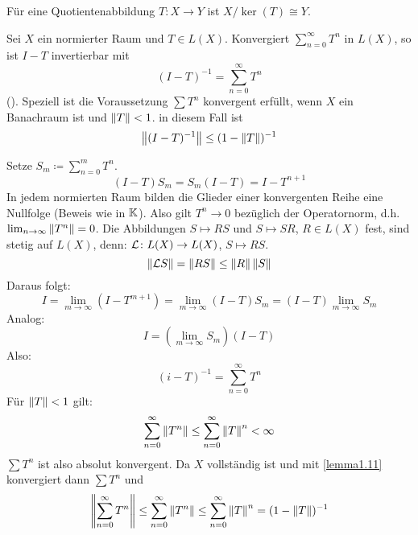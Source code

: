 \begin{bemerkung*}
	F\"ur eine Quotientenabbildung $ T\colon X\rightarrow Y $ ist $ X/\ker(T)\cong Y $. 
\end{bemerkung*}
\begin{satz}
	Sei $ X $ ein normierter Raum und $ T\in L(X) $. Konvergiert $ \sum_{n=0}^{\infty}T^n $ in $ L(X) $, so ist $ I-T $ invertierbar mit
	\[ (I-T)^{-1}=\sum_{n=0}^{\infty}T^n \] (). Speziell ist die Voraussetzung $ \sum T^n $ konvergent erf\"ullt, wenn $ X $ ein Banachraum ist und $ \left\|T\right\|<1 $. in diesem Fall ist
	\[ \left\|(I-T)^{-1}\right\|\leq (1-\left\|T\right\|)^{-1} \]
\end{satz}
\begin{beweis}
	Setze $ S_m\coloneqq\sum_{n=0}^m T^n $.
	\[ (I-T)S_m=S_m(I-T)=I-T^{n+1} \]
	In jedem normierten Raum bilden die Glieder einer konvergenten Reihe eine Nullfolge (Beweis wie in $ \mathbb{K} $). Also gilt $ T^n\rightarrow 0 $ bez\"uglich der Operatornorm, d.h. $ \lim_{n\to\infty}\left\|T^n\right\|=0 $. Die Abbildungen $ S\mapsto RS $ und $ S\mapsto SR $, $ R\in L(X) $ fest, sind stetig auf $ L(X) $, denn: $ \mathcal L\colon L(X)\rightarrow L(X) $, $ S\mapsto RS $.
	\[ \left\|\mathcal L S\right\|=\left\|RS\right\|\leq\left\|R\right\|\left\|S\right\| \]
	Daraus folgt:
	\[ I=\lim_{m\to\infty}(I-T^{m+1})=\lim_{m\to\infty}(I-T)S_m=(I-T)\lim_{m\to\infty}S_m \]
	Analog:
	\[ I=\left(\lim_{m\to\infty} S_m\right)(I-T)\]
	Also:
	\[ (i-T)^{-1}=\sum_{n=0}^\infty T^n\]
	F\"ur $ \left\|T\right\|<1 $ gilt:
	\[ \sum_{n=0}^{\infty}\left\|T^n\right\|\leq\sum_{n=0}^{\infty}\left\|T\right\|^n<\infty \]
	$ \sum T^n $ ist also absolut konvergent. Da $ X $ vollst\"andig ist und mit \ref{lemma1.11} konvergiert dann $ \sum T^n $ und
	\[ \left\|\sum_{n=0}^\infty T^n\right\|\leq\sum_{n=0}^\infty\left\|T^n\right\|\leq\sum_{n=0}^\infty\left\|T\right\|^n=(1-\left\|T\right\|)^{-1} \]
\end{beweis}